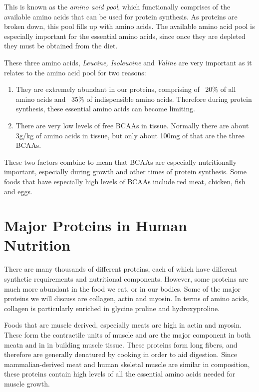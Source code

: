 \documentclass{tufte-handout}
\begin{document}
  This is known as the \emph{amino acid pool}, which functionally comprises of the available amino acids that can be used for protein synthesis.  As proteins are broken down, this pool fills up with amino acids.  The available amino acid pool is especially important for the essential amino acids, since once they are depleted they must be obtained from the diet.

  These three amino acids, \emph{Leucine, Isoleucine} and \emph{Valine} are very important as it relates to the amino acid pool for two reasons:
\begin{enumerate}
\item They are extremely abundant in our proteins, comprising of ~20\% of all amino acids and ~35\% of indispensible amino acids.  Therefore during protein synthesis, these essential amino acids can become limiting.
\item There are very low levels of free BCAAs in tissue.  Normally there are about 3g/kg of amino acids in tissue, but only about 100mg of that are the three BCAAs.
\end{enumerate}

These two factors combine to mean that BCAAs are especially nutritionally important, especially during growth and other times of protein synthesis.  Some foods that have especially high levels of BCAAs include red meat, chicken, fish and eggs.

\section{Major Proteins in Human Nutrition}
There are many thousands of different proteins, each of which have different synthetic requirements and nutritional components.  However, some proteins are much more abundant in the food we eat, or in our bodies.  Some of the major proteins we will discuss are collagen, actin and myosin.  In terms of amino acids, collagen is particularly enriched in glycine proline and hydroxyproline.

  Foods that are muscle derived, especially meats are high in actin and myosin.  These form the contractile units of muscle and are the major component in both meatn and in in building muscle tissue.  These proteins form long fibers, and therefore are generally denatured by cooking in order to aid digestion.  Since mammalian-derived meat and human skeletal muscle are similar in composition, these proteins contain high levels of all the essential amino acids needed for muscle growth.
\end{document}
